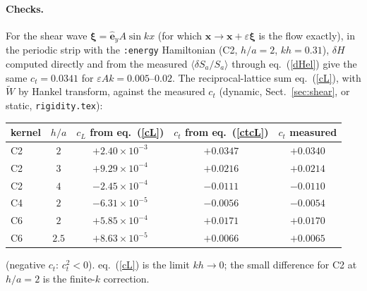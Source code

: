 \documentclass[11pt,aps,preprint,nofootinbib,superscriptaddress,tightenlines]{revtex4-2}
\def\Eq#1{eq.~(\ref{#1})}
\def\Sect#1{Sect.~\ref{#1}}
\let\oldparagraph\paragraph
\renewcommand{\paragraph}{\par\bigskip\oldparagraph}
\begin{document}
\paragraph{Checks.}  For the shear wave $\bm\xi=\hat{\bm e}_yA\sin kx$ (for which
$\bm x\to\bm x+\varepsilon\bm\xi$ is the flow exactly), in the periodic strip with the
\texttt{:energy} Hamiltonian (C2, $h/a=2$, $kh=0.31$), $\delta H$ computed directly and from
the measured $\langle\delta S_a/S_a\rangle$ through \Eq{dHel} give the same $c_t=0.0341$ for
$\varepsilon Ak=0.005$--$0.02$.  The reciprocal-lattice sum \Eq{cL}, with $\tilde W$ by Hankel
transform, against the measured $c_t$ (dynamic, \Sect{sec:shear}, or static,
\texttt{rigidity.tex}):
\begin{center}
\begin{tabular}{lcccc}
\hline
kernel & $h/a$ & $c_L$ from \Eq{cL} & $c_t$ from \Eq{ctcL} & $c_t$ measured \\ \hline
C2 & $2$   & $+2.40\times10^{-3}$ & $+0.0347$ & $+0.0340$ \\
C2 & $3$   & $+9.29\times10^{-4}$ & $+0.0216$ & $+0.0214$ \\
C2 & $4$   & $-2.45\times10^{-4}$ & $-0.0111$ & $-0.0110$ \\
C4 & $2$   & $-6.31\times10^{-5}$ & $-0.0056$ & $-0.0054$ \\
C6 & $2$   & $+5.85\times10^{-4}$ & $+0.0171$ & $+0.0170$ \\
C6 & $2.5$ & $+8.63\times10^{-5}$ & $+0.0066$ & $+0.0065$ \\
\hline
\end{tabular}
\end{center}
(negative $c_t$: $c_t^2<0$).  \Eq{cL} is the limit $kh\to0$; the small difference for C2 at
$h/a=2$ is the finite-$k$ correction.
\end{document}
